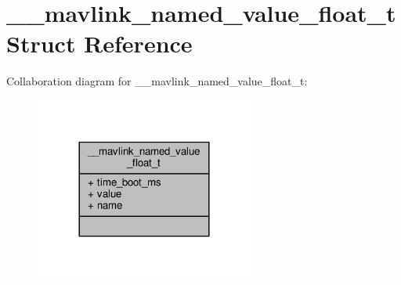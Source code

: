 \hypertarget{struct____mavlink__named__value__float__t}{\section{\+\_\+\+\_\+mavlink\+\_\+named\+\_\+value\+\_\+float\+\_\+t Struct Reference}
\label{struct____mavlink__named__value__float__t}
}


Collaboration diagram for \+\_\+\+\_\+mavlink\+\_\+named\+\_\+value\+\_\+float\+\_\+t\+:
\nopagebreak
\begin{figure}[H]
\begin{center}
\leavevmode
\includegraphics[width=204pt]{struct____mavlink__named__value__float__t__coll__graph}
\end{center}
\end{figure}
